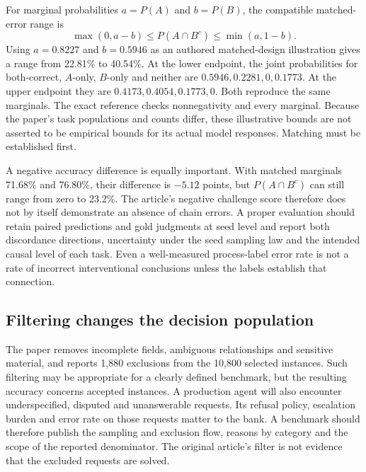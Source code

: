For marginal probabilities $a=P(A)$ and $b=P(B)$, the compatible matched-error range is
\begin{equation}
 \max(0,a-b)\leq P(A\cap B^c)\leq\min(a,1-b).
 \label{exec21:check-bounds}
\end{equation}
Using $a=0.8227$ and $b=0.5946$ as an authored matched-design illustration gives a range from 22.81\% to 40.54\%. At the lower endpoint, the joint probabilities for both-correct, $A$-only, $B$-only and neither are $0.5946,0.2281,0,0.1773$. At the upper endpoint they are $0.4173,0.4054,0.1773,0$. Both reproduce the same marginals. The exact reference checks nonnegativity and every marginal. Because the paper's task populations and counts differ, these illustrative bounds are not asserted to be empirical bounds for its actual model responses. Matching must be established first.~\citep{exec21_causalitycheck_reference}

A negative accuracy difference is equally important. With matched marginals 71.68\% and 76.80\%, their difference is $-5.12$ points, but $P(A\cap B^c)$ can still range from zero to 23.2\%. The article's negative challenge score therefore does not by itself demonstrate an absence of chain errors. A proper evaluation should retain paired predictions and gold judgments at seed level and report both discordance directions, uncertainty under the seed sampling law and the intended causal level of each task. Even a well-measured process-label error rate is not a rate of incorrect interventional conclusions unless the labels establish that connection.~\citep{exec21_causalitycheck,exec21_causalitycheck_reference}

\subsection{Filtering changes the decision population}
\label{exec21:check-selection}
The paper removes incomplete fields, ambiguous relationships and sensitive material, and reports 1,880 exclusions from the 10,800 selected instances. Such filtering may be appropriate for a clearly defined benchmark, but the resulting accuracy concerns accepted instances. A production agent will also encounter underspecified, disputed and unanswerable requests. Its refusal policy, escalation burden and error rate on those requests matter to the bank. A benchmark should therefore publish the sampling and exclusion flow, reasons by category and the scope of the reported denominator. The original article's filter is not evidence that the excluded requests are solved.~\citep{exec21_causalitycheck,exec21_causalitycheck_reference}

